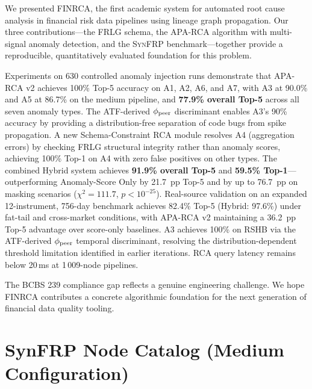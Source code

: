\documentclass{article}
\newcommand{\finrca}{\textsc{FINRCA}}
\newcommand{\aparca}{\textsc{APA-RCA}}
\newcommand{\synfrp}{\textsc{SynFRP}}
\begin{document}
We presented \finrca{}, the first academic system for automated root cause
analysis in financial risk data pipelines using lineage graph propagation.
Our three contributions---the FRLG schema, the \aparca{} algorithm with
multi-signal anomaly detection, and the \synfrp{} benchmark---together provide
a reproducible, quantitatively evaluated foundation for this problem.

Experiments on 630 controlled anomaly injection runs demonstrate that
\aparca{} v2 achieves 100\% Top-5 accuracy on A1, A2, A6, and A7,
with A3 at 90.0\% and A5 at 86.7\% on the medium pipeline, and
\textbf{77.9\% overall Top-5} across all seven anomaly types.
The ATF-derived $\phi_{\rm peer}$ discriminant enables A3's 90\% accuracy
by providing a distribution-free separation of code bugs from spike propagation.
A new Schema-Constraint RCA module resolves A4 (aggregation errors) by
checking FRLG structural integrity rather than anomaly scores, achieving
100\% Top-1 on A4 with zero false positives on other types.
The combined Hybrid system achieves \textbf{91.9\% overall Top-5} and
\textbf{59.5\% Top-1}---outperforming Anomaly-Score Only by 21.7~pp Top-5 and by up to
76.7~pp on masking scenarios ($\chi^2=111.7$, $p<10^{-25}$).
Real-source validation on an expanded 12-instrument, 756-day benchmark
achieves 82.4\% Top-5 (Hybrid: 97.6\%) under fat-tail and cross-market conditions,
with \aparca{} v2 maintaining a 36.2~pp Top-5 advantage over score-only baselines.
A3 achieves 100\% on RSHB via the ATF-derived $\phi_{\rm peer}$ temporal discriminant, resolving the distribution-dependent threshold limitation identified in earlier iterations.
RCA query latency remains below 20\,ms at 1\,009-node pipelines.

The BCBS 239 compliance gap reflects a genuine engineering challenge.
We hope \finrca{} contributes a concrete algorithmic foundation for
the next generation of financial data quality tooling.




\appendix

\section{SynFRP Node Catalog (Medium Configuration)}
\label{app:catalog}
\end{document}
